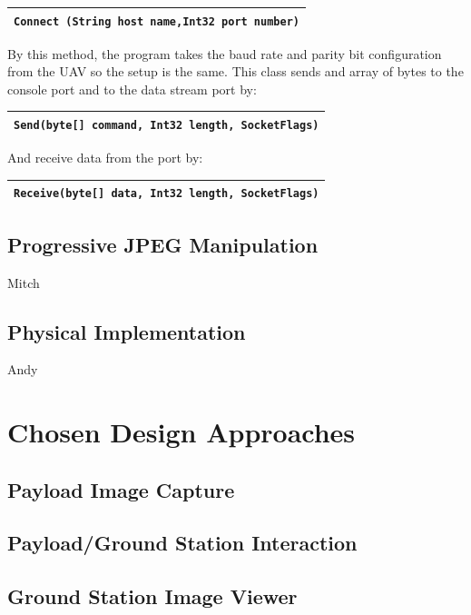 \documentclass[oneside]{ecsgdp}         %
\begin{document}
\begin{tabular}{|p{14.5cm}|}
\hline
\texttt{Connect (String host name,Int32 port number)}
\\
\hline
\end{tabular} 

By this method, the program takes the baud rate and parity bit configuration from the UAV so the setup is the same. This class sends and array of bytes to the console port and to the data stream port by:

\begin{tabular}{|p{14.5cm}|}
\hline
\texttt{Send(byte[] command, Int32 length, SocketFlags)}
\\
\hline
\end{tabular} 


And receive data from the port by:


\begin{tabular}{|p{14.5cm}|}
\hline
\texttt{Receive(byte[] data, Int32 length, SocketFlags)}
\\
\hline
\end{tabular} 

\section{Progressive JPEG Manipulation}
Mitch

\section{Physical Implementation}
Andy


\chapter{Chosen Design Approaches}


\section{Payload Image Capture}

\section{Payload/Ground Station Interaction}

\section{Ground Station Image Viewer}
\end{document}
